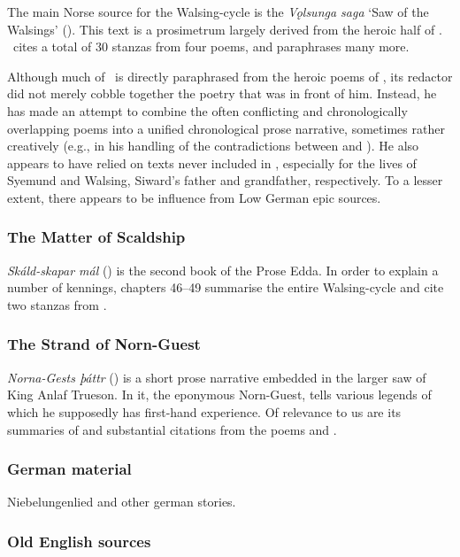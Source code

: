 The main Norse source for the Walsing-cycle is the \emph{Vǫlsunga saga} ‘Saw of the Walsings’ (\VolsungaSaga).  This text is a prosimetrum largely derived from the heroic half of \Regius.  \VolsungaSaga\ cites a total of 30 stanzas from four poems, and paraphrases many more.

Although much of \VolsungaSaga\ is directly paraphrased from the heroic poems of \Regius, its redactor did not merely cobble together the poetry that was in front of him.  Instead, he has made an attempt to combine the often conflicting and chronologically overlapping poems into a unified chronological prose narrative, sometimes rather creatively (e.g., in his handling of the contradictions between  and ).  He also appears to have relied on texts never included in \Regius, especially for the lives of Syemund and Walsing, Siward’s father and grandfather, respectively.  To a lesser extent, there appears to be influence from Low German epic sources.

\subsubsection{The Matter of Scaldship}

\emph{Skáld-skapar mál} (\Skaldskaparmal) is the second book of the Prose Edda.  In order to explain a number of kennings, chapters 46--49 summarise the entire Walsing-cycle and cite two stanzas from .

\subsubsection{The Strand of Norn-Guest}

\emph{Norna-Gests þáttr} (\Nornagest) is a short prose narrative embedded in the larger saw of King Anlaf Trueson.  In it, the eponymous Norn-Guest, tells various legends of which he supposedly has first-hand experience.  Of relevance to us are its summaries of and substantial citations from the poems  and .

\subsubsection{German material}

Niebelungenlied and other german stories.

\subsubsection{Old English sources}

